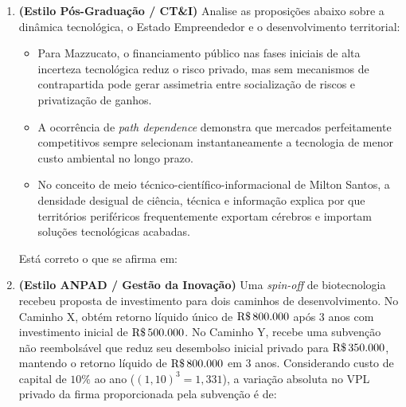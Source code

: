 
\begin{enumerate}[leftmargin=1.6em, itemsep=8pt]
  \item \textbf{(Estilo Pós-Graduação / CT\&I)} Analise as proposições abaixo sobre a dinâmica tecnológica, o Estado Empreendedor e o desenvolvimento territorial:
  \begin{itemize}[leftmargin=1.2em, itemsep=2pt]
    \item[I.] Para Mazzucato, o financiamento público nas fases iniciais de alta incerteza tecnológica reduz o risco privado, mas sem mecanismos de contrapartida pode gerar assimetria entre socialização de riscos e privatização de ganhos.
    \item[II.] A ocorrência de \textit{path dependence} demonstra que mercados perfeitamente competitivos sempre selecionam instantaneamente a tecnologia de menor custo ambiental no longo prazo.
    \item[III.] No conceito de meio técnico-científico-informacional de Milton Santos, a densidade desigual de ciência, técnica e informação explica por que territórios periféricos frequentemente exportam cérebros e importam soluções tecnológicas acabadas.
  \end{itemize}
  Está correto o que se afirma em:

  \item \textbf{(Estilo ANPAD / Gestão da Inovação)} Uma \textit{spin-off} de biotecnologia recebeu proposta de investimento para dois caminhos de desenvolvimento. No Caminho X, obtém retorno líquido único de $\text{R\$\,}{800.000}$ após $3$ anos com investimento inicial de $\text{R\$\,}{500.000}$. No Caminho Y, recebe uma subvenção não reembolsável que reduz seu desembolso inicial privado para $\text{R\$\,}{350.000}$, mantendo o retorno líquido de $\text{R\$\,}{800.000}$ em $3$ anos. Considerando custo de capital de $10\%$ ao ano ($(1{,}10)^3 = 1{,}331$), a variação absoluta no VPL privado da firma proporcionada pela subvenção é de:


\end{enumerate}
